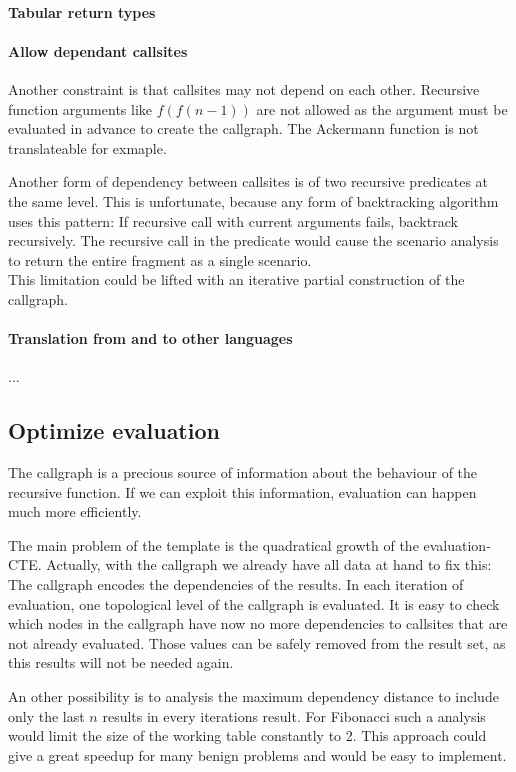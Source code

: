\paragraph*{Tabular return types}

\paragraph*{Allow dependant callsites}
Another constraint is that callsites may not depend on each other. Recursive function arguments like $f(f(n-1))$ are not allowed as the argument must be evaluated in advance to create the callgraph. The Ackermann function is not translateable for exmaple.

Another form of dependency between callsites is of two recursive predicates at the same level. This is unfortunate, because any form of backtracking algorithm uses this pattern: If recursive call with current arguments fails, backtrack recursively. The recursive call in the predicate would cause the scenario analysis to return the entire fragment as a single scenario.\\
This limitation could be lifted with an iterative partial construction of the callgraph.

\paragraph*{Translation from and to other languages}
...

\subsection{Optimize evaluation}

The callgraph is a precious source of information about the behaviour of the recursive function. If we can exploit this information, evaluation can happen much more efficiently.

The main problem of the template is the quadratical growth of the evaluation-CTE. Actually, with the callgraph we already have all data at hand to fix this: The callgraph encodes the dependencies of the results. In each iteration of evaluation, one topological level of the callgraph is evaluated. It is easy to check which nodes in the callgraph have now no more dependencies to callsites that are not already evaluated. Those values can be safely removed from the result set, as this results will not be needed again.

An other possibility is to analysis the maximum dependency distance to include only the last $n$ results in every iterations result. For Fibonacci such a analysis would limit the size of the working table constantly to 2. This approach could give a great speedup for many benign problems and would be easy to implement.


